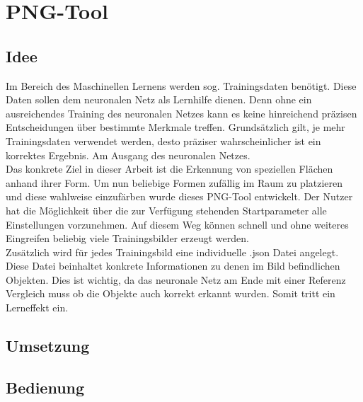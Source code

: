 
\section{PNG-Tool}

\subsection{Idee}

Im Bereich des Maschinellen Lernens werden sog. Trainingsdaten benötigt. Diese Daten sollen dem neuronalen Netz als Lernhilfe dienen. Denn ohne ein ausreichendes Training des neuronalen Netzes kann es keine hinreichend präzisen Entscheidungen über bestimmte Merkmale treffen.
Grundsätzlich gilt, je mehr Trainingsdaten verwendet werden, desto präziser wahrscheinlicher ist ein korrektes Ergebnis. Am Ausgang des neuronalen Netzes. \\

Das konkrete Ziel in dieser Arbeit ist die Erkennung von speziellen Flächen anhand ihrer Form. Um nun beliebige Formen zufällig im Raum zu platzieren und diese wahlweise einzufärben wurde dieses PNG-Tool entwickelt. Der Nutzer hat die Möglichkeit über die zur Verfügung stehenden Startparameter alle Einstellungen vorzunehmen. Auf diesem Weg können schnell und ohne weiteres Eingreifen beliebig viele Trainingsbilder erzeugt werden. \\

Zusätzlich wird für jedes Trainingsbild eine individuelle .json Datei angelegt. Diese Datei beinhaltet konkrete Informationen zu denen im Bild befindlichen Objekten. Dies ist wichtig, da das neuronale Netz am Ende mit einer Referenz Vergleich muss ob die Objekte auch korrekt erkannt wurden. Somit tritt ein Lerneffekt ein.  
\newpage

\subsection{Umsetzung}



\newpage

\subsection{Bedienung}

